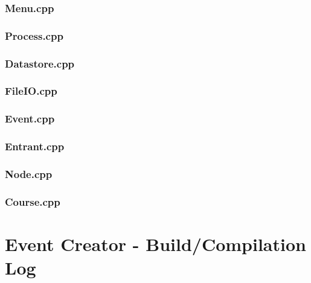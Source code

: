 \documentclass[a4paper, 10pt]{article}
\begin{document}
\clearpage
\subsubsection{Menu.cpp}


\clearpage
\subsubsection{Process.cpp}


\clearpage
\subsubsection{Datastore.cpp}


\clearpage
\subsubsection{FileIO.cpp}


\clearpage
\subsubsection{Event.cpp}


\clearpage
\subsubsection{Entrant.cpp}


\clearpage
\subsubsection{Node.cpp}


\clearpage
\subsubsection{Course.cpp}


\clearpage
\section{Event Creator - Build/Compilation Log}
\end{document}
